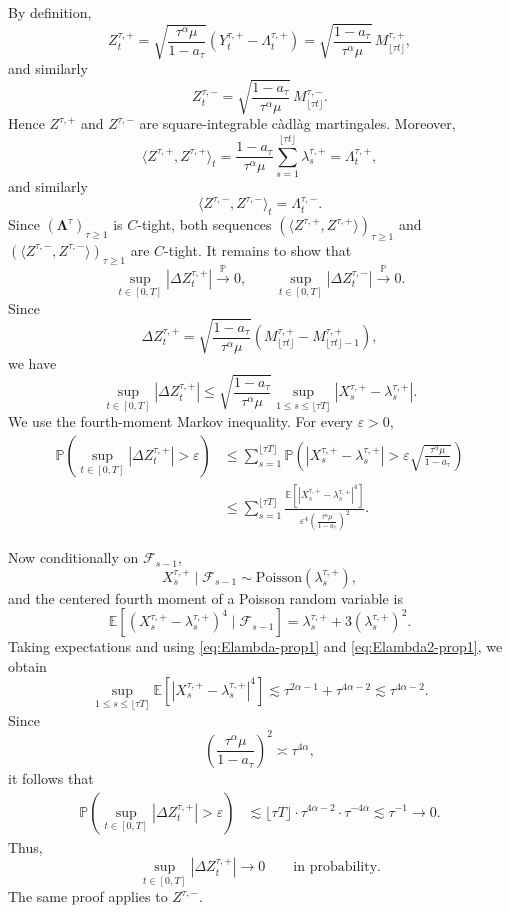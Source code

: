 \documentclass[letterpaper]{article}
\numberwithin{equation}{section}
\theoremstyle{definition}
\theoremstyle{remark}
\newcommand{\E}{\mathbb{E}}
\begin{document}
By definition,
\[
  Z_t^{\tau,+}
  =
  \sqrt{\frac{\tau^\alpha\mu}{1-a_\tau}}
  \left(Y_t^{\tau,+}-\Lambda_t^{\tau,+}\right)
  =
  \sqrt{\frac{1-a_\tau}{\tau^\alpha\mu}}\,M_{\lfloor \tau t\rfloor}^{\tau,+},
\]
and similarly
\[
  Z_t^{\tau,-}
  =
  \sqrt{\frac{1-a_\tau}{\tau^\alpha\mu}}\,M_{\lfloor \tau t\rfloor}^{\tau,-}.
\]
Hence $Z^{\tau,+}$ and $Z^{\tau,-}$ are square-integrable c\`adl\`ag martingales. Moreover,
\[
  \langle Z^{\tau,+},Z^{\tau,+}\rangle_t
  =
  \frac{1-a_\tau}{\tau^\alpha\mu}
  \sum_{s=1}^{\lfloor \tau t\rfloor}\lambda_s^{\tau,+}
  =
  \Lambda_t^{\tau,+},
\]
and similarly
\[
  \langle Z^{\tau,-},Z^{\tau,-}\rangle_t
  =
  \Lambda_t^{\tau,-}.
\]
Since $(\boldsymbol\Lambda^\tau)_{\tau\ge1}$ is $C$-tight, both sequences
$(\langle Z^{\tau,+},Z^{\tau,+}\rangle)_{\tau\ge1}$ and
$(\langle Z^{\tau,-},Z^{\tau,-}\rangle)_{\tau\ge1}$ are $C$-tight.
It remains to show that
\[
  \sup_{t\in[0,T]}\left|\Delta Z_t^{\tau,+}\right|\xrightarrow{\mathbb P}0,
  \qquad
  \sup_{t\in[0,T]}\left|\Delta Z_t^{\tau,-}\right|\xrightarrow{\mathbb P}0.
\]
Since
\[
  \Delta Z_t^{\tau,+}
  =
  \sqrt{\frac{1-a_\tau}{\tau^\alpha\mu}}
  \left(M_{\lfloor \tau t\rfloor}^{\tau,+}-M_{\lfloor \tau t\rfloor-1}^{\tau,+}\right),
\]
we have
\[
  \sup_{t\in[0,T]}\left|\Delta Z_t^{\tau,+}\right|
  \le
  \sqrt{\frac{1-a_\tau}{\tau^\alpha\mu}}
  \sup_{1\le s\le \lfloor \tau T\rfloor}
  \left|X_s^{\tau,+}-\lambda_s^{\tau,+}\right|.
\]
We use the fourth-moment Markov inequality. For every $\varepsilon>0$,
\begin{align*}
  \mathbb P\!\left(
    \sup_{t\in[0,T]}\left|\Delta Z_t^{\tau,+}\right|>\varepsilon
  \right)
  &\le
  \sum_{s=1}^{\lfloor \tau T\rfloor}
  \mathbb P\!\left(
    \left|X_s^{\tau,+}-\lambda_s^{\tau,+}\right|
    >
    \varepsilon\sqrt{\frac{\tau^\alpha\mu}{1-a_\tau}}
  \right) \\
  &\le
  \sum_{s=1}^{\lfloor \tau T\rfloor}
  \frac{
    \E\!\left[\left|X_s^{\tau,+}-\lambda_s^{\tau,+}\right|^4\right]
  }{
    \varepsilon^4\left(\frac{\tau^\alpha\mu}{1-a_\tau}\right)^2
  }.
\end{align*}

Now conditionally on $\mathcal F_{s-1}$,
\[
  X_s^{\tau,+}\mid \mathcal F_{s-1}\sim \mathrm{Poisson}(\lambda_s^{\tau,+}),
\]
and the centered fourth moment of a Poisson random variable is
\[
  \E\!\left[
    \left(X_s^{\tau,+}-\lambda_s^{\tau,+}\right)^4 \mid \mathcal F_{s-1}
  \right]
  =
  \lambda_s^{\tau,+}+3(\lambda_s^{\tau,+})^2.
\]
Taking expectations and using \eqref{eq:Elambda-prop1} and \eqref{eq:Elambda2-prop1},
we obtain
\[
  \sup_{1\le s\le \lfloor \tau T\rfloor}
  \E\!\left[\left|X_s^{\tau,+}-\lambda_s^{\tau,+}\right|^4\right]
  \lesssim
  \tau^{2\alpha-1}+\tau^{4\alpha-2}
  \lesssim \tau^{4\alpha-2}.
\]
Since
\[
  \left(\frac{\tau^\alpha\mu}{1-a_\tau}\right)^2\asymp \tau^{4\alpha},
\]
it follows that
\begin{align*}
  \mathbb P\!\left(
    \sup_{t\in[0,T]}\left|\Delta Z_t^{\tau,+}\right|>\varepsilon
  \right)
  &\lesssim
  \lfloor \tau T\rfloor \cdot \tau^{4\alpha-2}\cdot \tau^{-4\alpha}
  \lesssim \tau^{-1}\to0.
\end{align*}
Thus,
\[
\sup_{t\in[0,T]}\left|\Delta Z_t^{\tau,+}\right|\to0
  \qquad\text{in probability.}
\]
The same proof applies to $Z^{\tau,-}$.
\end{document}

